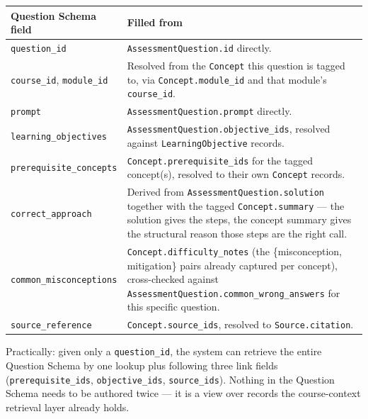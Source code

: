 \documentclass[11pt]{article}
\begin{document}
\begin{center}
\small
\begin{tabularx}{\linewidth}{P{4.0cm} X}
\toprule
\textbf{Question Schema field} & \textbf{Filled from} \\
\midrule
\texttt{question\_\allowbreak id} & \texttt{AssessmentQuestion.id} directly. \\
\texttt{course\_\allowbreak id}, \texttt{module\_\allowbreak id} & Resolved
  from the \texttt{Concept} this question is tagged to, via
  \texttt{Concept.module\_\allowbreak id} and that module's
  \texttt{course\_\allowbreak id}. \\
\texttt{prompt} & \texttt{AssessmentQuestion.prompt} directly. \\
\texttt{learning\_\allowbreak objectives} & \texttt{AssessmentQuestion.objective\_\allowbreak ids},
  resolved against \texttt{LearningObjective} records. \\
\texttt{prerequisite\_\allowbreak concepts} & \texttt{Concept.prerequisite\_\allowbreak ids}
  for the tagged concept(s), resolved to their own \texttt{Concept} records. \\
\texttt{correct\_\allowbreak approach} & Derived from \texttt{AssessmentQuestion.solution}
  together with the tagged \texttt{Concept.summary} --- the solution gives
  the steps, the concept summary gives the structural reason those steps
  are the right call. \\
\texttt{common\_\allowbreak misconceptions} & \texttt{Concept.difficulty\_\allowbreak notes}
  (the \{misconception, mitigation\} pairs already captured per concept),
  cross-checked against \texttt{AssessmentQuestion.common\_\allowbreak wrong\_\allowbreak answers}
  for this specific question. \\
\texttt{source\_\allowbreak reference} & \texttt{Concept.source\_\allowbreak ids},
  resolved to \texttt{Source.citation}. \\
\bottomrule
\end{tabularx}
\end{center}

Practically: given only a \texttt{question\_id}, the system can retrieve the
entire Question Schema by one lookup plus following three link fields
(\texttt{prerequisite\_ids}, \texttt{objective\_ids}, \texttt{source\_ids}).
Nothing in the Question Schema needs to be authored twice --- it is a view
over records the course-context retrieval layer already holds.

\end{document}
